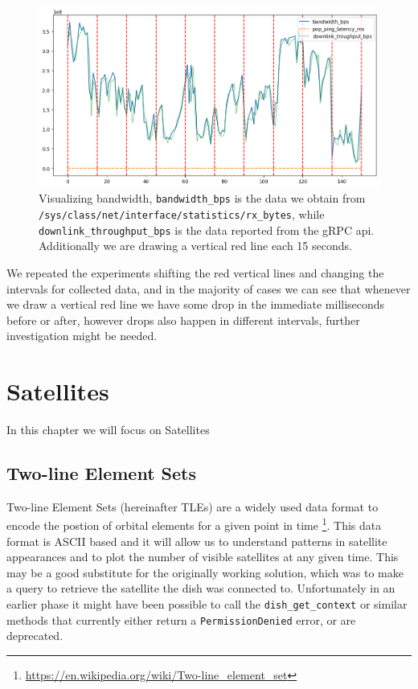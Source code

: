 \documentclass[IN,11pt,twoside,openright,bachelor,english]{tumthesis}
\begin{document}
\begin{figure}
	\label{fig:vis-bw-15sec}
	\centering
	\includegraphics[width=1\columnwidth]{img/bw-15seconds.png}
	\caption{Visualizing bandwidth, \texttt{bandwidth\_bps} is the data we obtain from \texttt{/sys/class/net/{interface}/statistics/rx\_bytes}, while \texttt{downlink\_throughput\_bps} is the data reported from the gRPC api. Additionally we are drawing a vertical red line each 15 seconds.}
\end{figure}

We repeated the experiments shifting the red vertical lines and changing the intervals for collected data, and in the majority of cases we can see that whenever we draw a vertical red line we have some drop in the immediate milliseconds before or after, however drops also happen in different intervals, further investigation might be needed.


\chapter{Satellites}
\label{chap:sats}

In this chapter we will focus on Satellites
\section{Two-line Element Sets}
Two-line Element Sets (hereinafter TLEs) are a widely used data format to encode the postion of orbital elements for a given point in time \footnote{\url{https://en.wikipedia.org/wiki/Two-line_element_set}}. This data format is ASCII based and it will allow us to understand patterns in satellite appearances and to plot the number of visible satellites at any given time. This may be a good substitute for the originally working solution, which was to make a query to retrieve the satellite the dish was connected to. Unfortunately in an earlier phase it might have been possible to call the \texttt{dish\_get\_context} or similar methods that currently either return a \texttt{PermissionDenied} error, or are deprecated.
\end{document}
